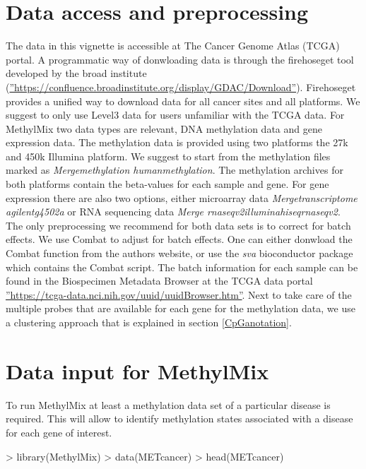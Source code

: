 \documentclass[11pt]{article}
\begin{document}
\section{Data access and preprocessing}
The data in this vignette is accessible at The Cancer Genome Atlas (TCGA) 
portal. A programmatic way of donwloading data is through the firehose\textunderscore get 
tool developed by the broad institute (\hyperref[label_name]
{''https://confluence.broadinstitute.org/display/GDAC/Download''}). Firehose\textunderscore get
provides a unified way to download data for all cancer sites and all platforms.
We suggest to only use Level3 data for users unfamiliar with the TCGA data. For 
MethylMix two data types are relevant, DNA methylation data and gene expression 
data. The methylation data is provided using two platforms the 27k and 450k 
Illumina platform. We suggest to start from the methylation files marked as 
\emph{Merge\textunderscore methylation\textunderscore \textunderscore 
humanmethylation}. The methylation archives for both platforms contain the
beta-values for each sample and gene. For gene expression there are also two options, either 
microarray data \emph{Merge\textunderscore transcriptome\textunderscore 
\textunderscore agilentg4502a} or RNA sequencing data \emph{Merge\textunderscore 
rnaseqv2\textunderscore \textunderscore illuminahiseq\textunderscore rnaseqv2}.\\
The only preprocessing we recommend for both data sets is to correct for batch 
effects. We use Combat to adjust for batch effects. One can either donwload the 
Combat function from the authors website, or use the \emph{sva} bioconductor 
package which contains the Combat script. The batch information for each sample 
can be found in the Biospecimen Metadata Browser at the TCGA data portal 
\hyperref[TCGAbatch]{''https://tcga-data.nci.nih.gov/uuid/uuidBrowser.htm''}.
Next to take care of the multiple probes that are available for each gene for 
the methylation data, we use a clustering approach that is explained in section 
\ref{CpGanotation}.

\section{Data input for MethylMix}
To run MethylMix at least a methylation data set of a particular disease is 
required. This will allow to identify methylation states associated with a 
disease for each gene of interest. 

\begin{Schunk}
\begin{Sinput}
> library(MethylMix)
> data(METcancer)
> head(METcancer)
\end{Sinput}
\end{Schunk}
\end{document}
